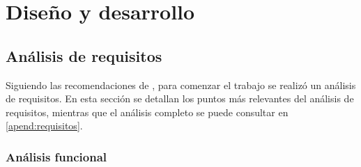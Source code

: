 \chapter{Diseño y desarrollo\label{sec:disenhoYDesarrollo}}



\section{Análisis de requisitos}

Siguiendo las recomendaciones de \cite{ISO12207}, para comenzar el trabajo se realizó un análisis de requisitos. En esta sección se detallan los puntos más relevantes del análisis de requisitos, mientras que el análisis completo se puede consultar en \ref{apend:requisitos}.

\subsection{Análisis funcional}

